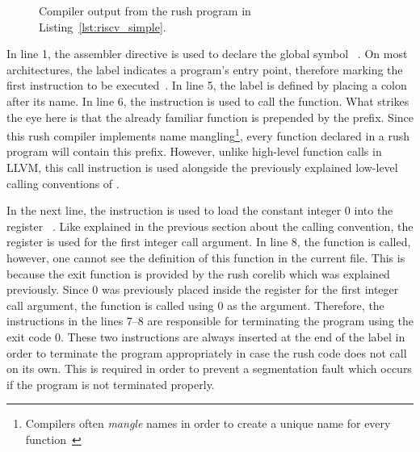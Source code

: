 
\begin{wrapfigure}{L}{0.5\textwidth}
	\centering
	\caption{Compiler output from the rush program in Listing~\ref{lst:riscv_simple}.}\label{lst:riscv_simple_asm}
\end{wrapfigure}

In line 1, the  assembler directive is used to declare the global symbol ~\cite[p.~36]{Patterson2017}.
On most architectures, the  label indicates a program's entry point, therefore marking the first instruction to be executed~\cite[p.~19]{Zhirkov2017-wk}.
In line 5, the  label is defined by placing a colon after its name.
In line 6, the  instruction is used to call the  function.
What strikes the eye here is that the already familiar  function is prepended by the  prefix.
Since this rush compiler implements name mangling\footnote{Compilers often \emph{mangle} names in order to create a unique name for every function~\cite[pp.~119-120]{Levine2000}},
every function declared in a rush program will contain this prefix.
However, unlike high-level function calls in LLVM, this call instruction is used alongside the previously explained low-level calling conventions of \riscv{}.

In the next line, the  instruction is used to load the constant integer 0 into the register ~\cite[reference card]{Patterson2017}.
Like explained in the previous section about the \riscv{} calling convention,
the register  is used for the first integer call argument.
In line 8, the  function is called, however, one cannot see the definition of this function in the current file.
This is because the exit function is provided by the rush \riscv{} corelib which was explained previously.
Since 0 was previously placed inside the register for the first integer call argument, the  function is called using 0 as the argument.
Therefore, the instructions in the lines 7--8 are responsible for terminating the program using the exit code 0.
These two instructions are always inserted at the end of the  label in order to terminate the program appropriately in case the rush code does not call  on its own.
This is required in order to prevent a segmentation fault which occurs if the program is not terminated properly.

